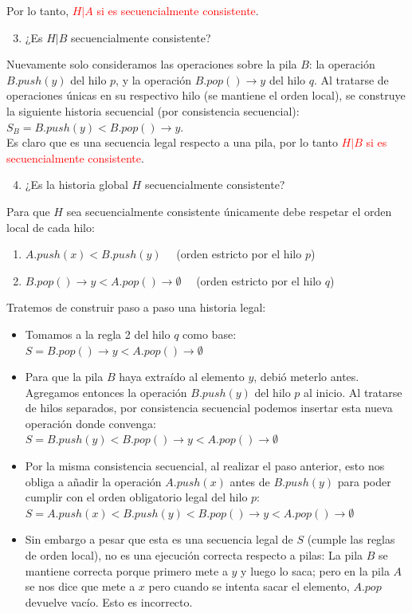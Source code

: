 Por lo tanto, \textcolor{red}{$H|A$ si es secuencialmente consistente}.
\begin{enumerate}
    \setcounter{enumi}{2}
    \item \textcolor{dkgreen}{¿Es $H|B$ secuencialmente consistente? }
\end{enumerate}
Nuevamente solo consideramos las operaciones sobre la pila $B$: la operación $B.push(y)$ del hilo $p$, y la operación $B.pop()\rightarrow y$ del hilo $q$.
Al tratarse de operaciones únicas en su respectivo hilo (se mantiene el orden local), se construye la siguiente historia secuencial (por consistencia secuencial): $S_B=B.push(y)<B.pop()\rightarrow y$.\\
Es claro que es una secuencia legal respecto a una pila, por lo tanto \textcolor{red}{$H|B$ si es secuencialmente consistente}.
\begin{enumerate}
    \setcounter{enumi}{3}
    \item \textcolor{dkgreen}{¿Es la historia global $H$ secuencialmente consistente?}
\end{enumerate}
Para que $H$ sea secuencialmente consistente únicamente debe respetar el orden local de cada hilo:
\begin{enumerate}[label=\arabic*.]
    \item $A.push(x) <B.push(y) \quad$ (orden estricto por el hilo $p$)
    \item $B.pop()\rightarrow y <A.pop()\rightarrow \emptyset \quad $ (orden estricto por el hilo $q$)
\end{enumerate}
Tratemos de construir paso a paso una historia legal:
\begin{itemize}
    \item Tomamos a la regla 2 del hilo $q$ como base:\\
    $S=B.pop()\rightarrow y <A.pop()\rightarrow \emptyset$
    \item Para que la pila $B$ haya extraído al elemento $y$, debió meterlo antes. Agregamos entonces la operación $B.push(y)$ del hilo $p$ al inicio. Al tratarse de hilos separados, por consistencia secuencial podemos insertar esta nueva operación donde convenga:
    $S=B.push(y) <B.pop()\rightarrow y <A.pop()\rightarrow \emptyset$
    \item Por la misma consistencia secuencial, al realizar el paso anterior, esto nos obliga a añadir la operación $A.push(x)$ antes de $B.push(y)$ para poder cumplir con el orden obligatorio legal del hilo $p$:\\
    $S=A.push(x)<B.push(y) <B.pop()\rightarrow y <A.pop()\rightarrow \emptyset$
    \item Sin embargo a pesar que esta es una secuencia legal de $S$ (cumple las reglas de orden local), no es una ejecución correcta respecto a pilas: La pila $B$ se mantiene correcta porque primero mete a $y$ y luego lo saca; pero en la pila $A$ se nos dice que mete a $x$ pero cuando se intenta sacar el elemento, $A.pop$ devuelve vacío. Esto es incorrecto.
\end{itemize}
